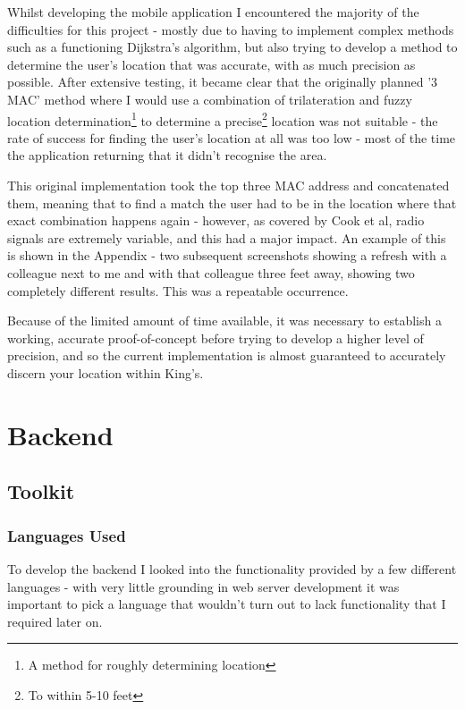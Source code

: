 \documentclass[11pt]{informatics-report}
\begin{document}
Whilst developing the mobile application I encountered the majority of the difficulties for this project - mostly due to having to implement complex methods such as a functioning Dijkstra's algorithm, but also trying to develop a method to determine the user's location that was accurate, with as much precision as possible. After extensive testing, it became clear that the originally planned '3 MAC' method where I would use a combination of trilateration and fuzzy location determination\footnote{A method for roughly determining location} to determine a precise\footnote{To within 5-10 feet} location was not suitable - the rate of success for finding the user's location at all was too low - most of the time the application returning that it didn't recognise the area.

This original implementation took the top three MAC address and concatenated them, meaning that to find a match the user had to be in the location where that exact combination happens again - however, as covered by Cook et al, radio signals are extremely variable\cite{cook2005indoor}, and this had a major impact. An example of this is shown in the Appendix - two subsequent screenshots showing a refresh with a colleague next to me and with that colleague three feet away, showing two completely different results. This was a repeatable occurrence. 

Because of the limited amount of time available, it was necessary to establish a working, accurate proof-of-concept before trying to develop a higher level of precision, and so the current implementation is almost guaranteed to accurately discern your location within King's.

\section{Backend}

\subsection{Toolkit}

\subsubsection{Languages Used}

To develop the backend I looked into the functionality provided by a few different languages - with very little grounding in web server development it was important to pick a language that wouldn't turn out to lack functionality that I required later on.
\end{document}

